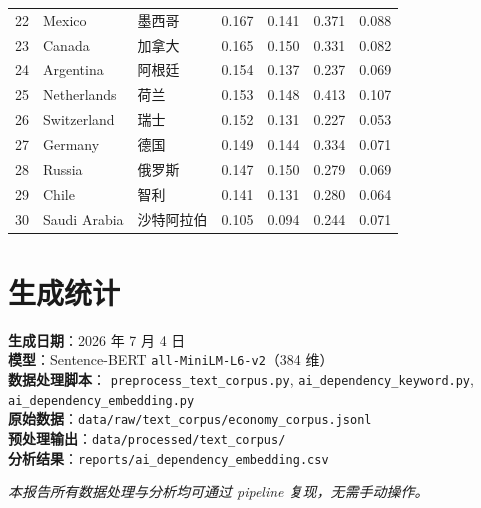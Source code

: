 \documentclass[11pt,a4paper]{article}
\begin{document}
\begin{longtable}{rllrrrr}
22 & Mexico & 墨西哥 & 0.167 & 0.141 & 0.371 & 0.088 \\
23 & Canada & 加拿大 & 0.165 & 0.150 & 0.331 & 0.082 \\
24 & Argentina & 阿根廷 & 0.154 & 0.137 & 0.237 & 0.069 \\
25 & Netherlands & 荷兰 & 0.153 & 0.148 & 0.413 & 0.107 \\
26 & Switzerland & 瑞士 & 0.152 & 0.131 & 0.227 & 0.053 \\
27 & Germany & 德国 & 0.149 & 0.144 & 0.334 & 0.071 \\
28 & Russia & 俄罗斯 & 0.147 & 0.150 & 0.279 & 0.069 \\
29 & Chile & 智利 & 0.141 & 0.131 & 0.280 & 0.064 \\
30 & Saudi Arabia & 沙特阿拉伯 & 0.105 & 0.094 & 0.244 & 0.071 \\
\end{longtable}

\section{生成统计}

\noindent
\textbf{生成日期}：2026 年 7 月 4 日 \\
\textbf{模型}：Sentence-BERT \texttt{all-MiniLM-L6-v2}（384 维） \\
\textbf{数据处理脚本}：
\texttt{preprocess\_text\_corpus.py}, \texttt{ai\_dependency\_keyword.py}, \texttt{ai\_dependency\_embedding.py} \\
\textbf{原始数据}：\texttt{data/raw/text\_corpus/economy\_corpus.jsonl} \\
\textbf{预处理输出}：\texttt{data/processed/text\_corpus/} \\
\textbf{分析结果}：\texttt{reports/ai\_dependency\_embedding.csv}

\vspace{1cm}
\noindent\textit{本报告所有数据处理与分析均可通过 pipeline 复现，无需手动操作。}
\end{document}
